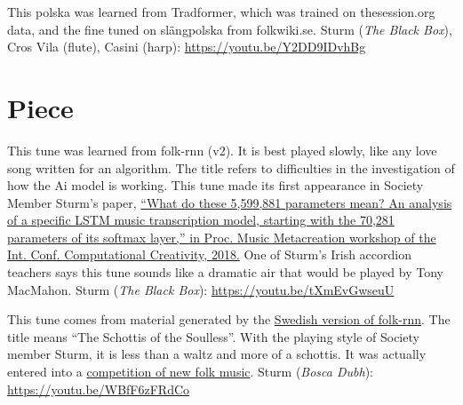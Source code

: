 \documentclass[a4paper,notitlepage,twoside]{book}
\begin{document}
{}  
\hypertarget{polska:UgglasPolska}{}
This polska was learned from Tradformer, which was trained on thesession.org data,
and the fine tuned on slängpolska from folkwiki.se.
Sturm ({\em The Black Box}), Cros Vila (flute), Casini (harp): \url{https://youtu.be/Y2DD9IDvhBg}



\clearpage
\section{Piece}
{}
\hypertarget{piece:WhyAreYou}{}
This tune was learned from folk-rnn (v2). 
It is best played slowly, like any love song written for an algorithm.
The title refers to difficulties in the investigation of how the Ai model is working.
This tune made its first appearance in Society Member Sturm's paper, 
\href{http://urn.kb.se/resolve?urn=urn:nbn:se:kth:diva-238604}
{``What do these 5,599,881 parameters mean? 
An analysis of a specific LSTM music transcription model, 
starting with the 70,281 parameters of its softmax layer,” 
in Proc. Music Metacreation workshop of the Int. Conf. Computational Creativity, 2018.}
One of Sturm's Irish accordion teachers says this tune sounds like a dramatic air
that would be played by Tony MacMahon.
Sturm ({\em The Black Box}): \url{https://youtu.be/tXmEvGwseuU}

{}  
  
\hypertarget{piece:SjallosasSchottis}{}
This tune comes from material generated by the \href{https://themachinefolksession.org/tune/1012}{Swedish version of folk-rnn}.
The title means ``The Schottis of the Soulless''.
With the playing style of Society member Sturm, it is less than a waltz and more of a schottis.
It was actually entered into a \href{https://www.stallet.st/sv/latskrivartavling}{competition of new folk music}.
Sturm ({\em Bosca Dubh}): \url{https://youtu.be/WBfF6zFRdCo}
\end{document}
